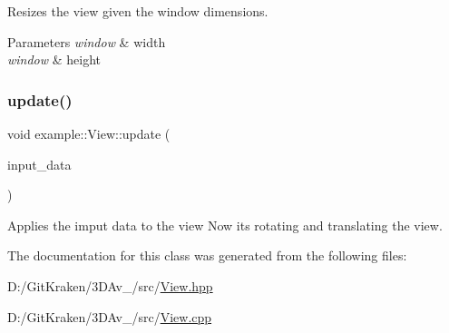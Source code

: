 Resizes the view given the window dimensions. 


\begin{DoxyParams}{Parameters}
{\em window} & width \\
\hline
{\em window} & height \\
\hline
\end{DoxyParams}
\mbox{\label{classexample_1_1_view_ac0b18fc4d2abe1abca6940c55313ef3b}} 
\subsubsection{\texorpdfstring{update()}{update()}}
{\footnotesize\ttfamily void example\+::\+View\+::update (\begin{DoxyParamCaption}\item[{\mbox{\hyperlink{classexample_1_1_input_a574fd91f61d018474389e778c31e0da2}{Input\+::\+Input\+Data}}}]{input\+\_\+data }\end{DoxyParamCaption})}



Applies the imput data to the view Now it\textquotesingle{}s rotating and translating the view. 



The documentation for this class was generated from the following files\+:\begin{DoxyCompactItemize}
\item 
D\+:/\+Git\+Kraken/3\+D\+Av\+\_/src/\mbox{\hyperlink{_view_8hpp}{View.\+hpp}}\item 
D\+:/\+Git\+Kraken/3\+D\+Av\+\_/src/\mbox{\hyperlink{_view_8cpp}{View.\+cpp}}\end{DoxyCompactItemize}
